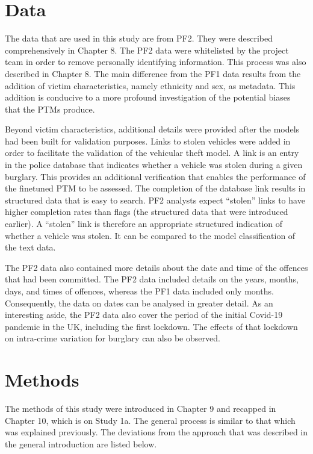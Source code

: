 \section{Data} The data that are used in this study are from PF2. They were described comprehensively in Chapter 8. The PF2 data were whitelisted by the project team in order to remove personally identifying information. This process was also described in Chapter 8. The main difference from the PF1 data results from the addition of victim characteristics, namely ethnicity and sex, as metadata. This addition is conducive to a more profound investigation of the potential biases that the PTMs produce.

Beyond victim characteristics, additional details were provided after the models had been built for validation purposes. Links to stolen vehicles were added in order to facilitate the validation of the vehicular theft model. A link is an entry in the police database that indicates whether a vehicle was stolen during a given burglary. This provides an additional verification that enables the performance of the finetuned PTM to be assessed. The completion of the database link results in structured data that is easy to search. PF2 analysts expect “stolen” links to have higher completion rates than flags (the structured data that were introduced earlier). A “stolen” link is therefore an appropriate structured indication of whether a vehicle was stolen. It can be compared to the model classification of the text data.

The PF2 data also contained more details about the date and time of the offences that had been committed. The PF2 data included details on the years, months, days, and times of offences, whereas the PF1 data included only months. Consequently, the data on dates can be analysed in greater detail. As an interesting aside, the PF2 data also cover the period of the initial Covid-19 pandemic in the UK, including the first lockdown. The effects of that lockdown on intra-crime variation for burglary can also be observed.


\section{Methods} The methods of this study were introduced in Chapter 9 and recapped in Chapter 10, which is on Study 1a. The general process is similar to that which was explained previously. The deviations from the approach that was described in the general introduction are listed below.

